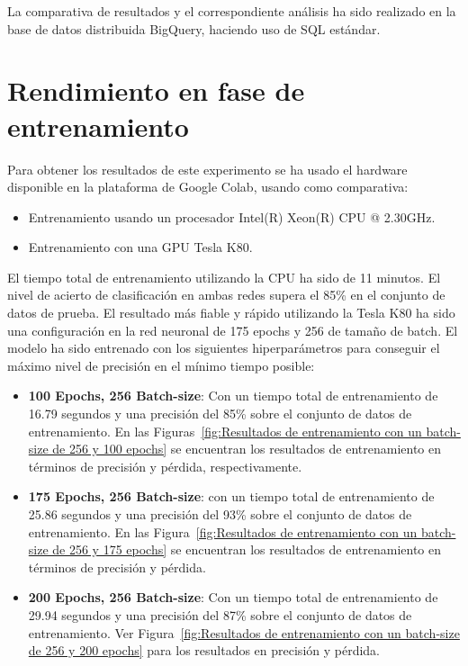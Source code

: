 La comparativa de resultados y el correspondiente análisis ha sido realizado en la base de datos distribuida BigQuery, haciendo uso de SQL estándar.


\section{Rendimiento en fase de entrenamiento}\label{sec:rendimiento-en-fase-de-entrenamiento}
Para obtener los resultados de este experimento se ha usado el hardware disponible en la plataforma de Google Colab, usando como comparativa:
\begin{itemize}
    \item Entrenamiento usando un procesador Intel(R) Xeon(R) CPU @ 2.30GHz.
    \item Entrenamiento con una GPU Tesla K80.
\end{itemize}

El tiempo total de entrenamiento utilizando la CPU ha sido de 11 minutos.
El nivel de acierto de clasificación en ambas redes supera el 85\% en el conjunto de datos de prueba.
El resultado más fiable y rápido utilizando la Tesla K80 ha sido una configuración en la red neuronal de 175 epochs y 256 de tamaño de batch.
El modelo ha sido entrenado con los siguientes hiperparámetros para conseguir el máximo nivel de precisión en el mínimo tiempo posible:

\begin{itemize}
    \item \textbf{100 Epochs, 256 Batch-size}: Con un tiempo total de entrenamiento de 16.79 segundos y una precisión del 85\% sobre el conjunto de datos de entrenamiento.
    En las Figuras~\ref{fig:Resultados de entrenamiento con un batch-size de 256 y 100 epochs} se encuentran los resultados de entrenamiento en términos de precisión y pérdida, respectivamente.
    \item \textbf{175 Epochs, 256 Batch-size}: con un tiempo total de entrenamiento de 25.86 segundos y una precisión del 93\% sobre el conjunto de datos de entrenamiento.
    En las Figura~\ref{fig:Resultados de entrenamiento con un batch-size de 256 y 175 epochs} se encuentran los resultados de entrenamiento en términos de precisión y pérdida.
    \item \textbf{200 Epochs, 256 Batch-size}: Con un tiempo total de entrenamiento de 29.94 segundos y una precisión del 87\% sobre el conjunto de datos de entrenamiento.
    Ver Figura~\ref{fig:Resultados de entrenamiento con un batch-size de 256 y 200 epochs} para los resultados en precisión y pérdida.
\end{itemize}


